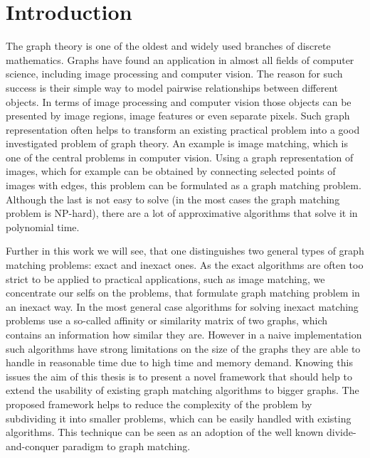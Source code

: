 \chapter{Introduction}
The graph theory is one of the oldest and widely used branches of discrete mathematics. Graphs have found an application in almost all fields of computer science, including image processing and computer vision. The reason for such success is their simple way to model pairwise relationships between different objects. In terms of image processing and computer vision those objects can be presented by image regions, image features or even separate pixels. Such graph representation often helps to transform an existing practical problem into a good investigated problem of graph theory. An example is image matching, which is one of the central problems in computer vision. %
Using a graph representation of images, which for example can be obtained by connecting selected points of images with edges, this problem can be formulated as a graph matching problem. Although the last is not easy to solve (in the most cases the graph matching problem is NP-hard), there are a lot of approximative algorithms that solve it in polynomial time.

Further in this work we will see, that one distinguishes two general types of graph matching problems: exact and inexact ones. As the exact algorithms are often too strict to be applied to practical applications, such as image matching, we concentrate our selfs on the problems, that formulate graph matching problem in an inexact way.
In the most general case algorithms for solving inexact matching problems use a so-called affinity or similarity matrix of two graphs, which contains an information how similar they are.
However in a naive implementation such algorithms have strong limitations on the size of the graphs they are able to handle in reasonable time due to high time and memory demand. Knowing this issues the aim of this thesis is to present a novel framework that should help to extend the usability of existing graph matching algorithms to bigger graphs. The proposed framework helps to reduce the complexity of the problem by subdividing it into smaller problems, which can be easily handled with existing algorithms. This technique can be seen as an adoption of the well known divide-and-conquer paradigm to graph matching.

